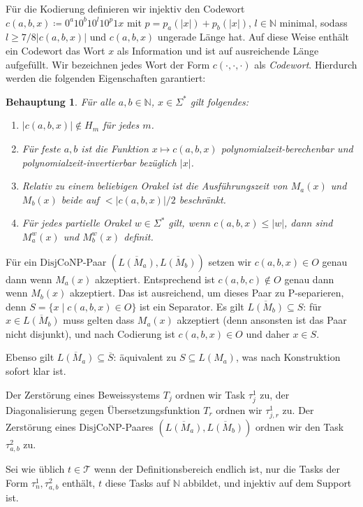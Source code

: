 \documentclass[nofonts]{uebung}
\newtheorem{claim}[theorem]{Behauptung}
\def\DisjCoNP{\ensuremath{\mathrm{DisjCoNP}}}
\begin{document}
Für die Kodierung definieren wir injektiv den Codewort $c(a,b,x)\coloneqq 0^a10^b10^l10^p1x$ mit $p=p_a(|x|)+p_b(|x|)$, $l\in \mathbb N$ minimal, sodass $l\geq 7/8 |c(a,b,x)|$ und $c(a,b,x)$ ungerade Länge hat. Auf diese Weise enthält ein Codewort das Wort $x$ als Information und ist auf ausreichende Länge aufgefüllt. Wir bezeichnen jedes Wort der Form $c(\cdot, \cdot, \cdot)$ als \emph{Codewort}. Hierdurch werden die folgenden Eigenschaften garantiert:
\begin{claim} Für alle $a,b\in\mathbb N$, $x\in\Sigma^*$ gilt folgendes:
\begin{enumerate}
\item $|c(a,b,x)| \not\in H_m$ für jedes $m$.
\item Für feste $a,b$ ist die Funktion $x \mapsto c(a,b,x)$ polynomialzeit-berechenbar und polynomialzeit-invertierbar bezüglich $|x|$.
\item Relativ zu einem beliebigen Orakel ist die Ausführungszeit von $M_a(x)$ und $M_b(x)$ beide auf $<|c(a,b,x)|/2$ beschränkt.
\item Für jedes partielle Orakel $w\in\Sigma^*$ gilt, wenn $c(a,b,x)\leq |w|$, dann sind $M_a^w(x)$ und $M_b^w(x)$ definit.
\end{enumerate}
\end{claim}

Für ein \DisjCoNP-Paar $(\overline{L(M_a)}, \overline{L(M_b)})$ setzen wir $c(a,b,x) \in O$ genau dann wenn $M_a(x)$ akzeptiert.
Entsprechend ist $c(a,b,c)\not\in O$ genau dann wenn $M_b(x)$ akzeptiert.
Das ist ausreichend, um dieses Paar zu P-separieren, denn $S=\{x \mid c(a,b,x)\in O\}$ ist ein Separator.
Es gilt $\overline{L(M_b)}\subseteq S$: für $x\in \overline{L(M_b)}$ muss gelten dass $M_a(x)$ akzeptiert (denn ansonsten ist das Paar nicht disjunkt), und nach Codierung ist $c(a,b,x)\in O$ und daher $x\in S$.

Ebenso gilt $\overline{L(M_a)}\subseteq \overline{S}$: äquivalent zu $S \subseteq L(M_a)$, was nach Konstruktion sofort klar ist.
\medskip

Der Zerstörung eines Beweissystems $T_j$ ordnen wir Task $\tau^1_j$ zu, der Diagonalisierung gegen Übersetzungsfunktion $T_r$ ordnen wir $\tau^1_{j,r}$ zu.
Der Zerstörung eines \DisjCoNP-Paares $(\overline{L(M_a)}, \overline{L(M_b)})$ ordnen wir den Task $\tau^2_{a,b}$ zu.

Sei wie üblich $t\in \mathcal T$ wenn der Definitionsbereich endlich ist, nur die Tasks der Form $\tau^1_{n}, \tau^2_{a,b}$ enthält, $t$ diese Tasks auf $\mathbb N$ abbildet, und injektiv auf dem Support ist.
\end{document}
